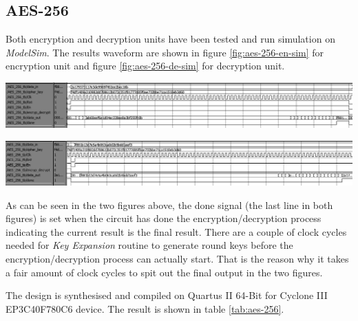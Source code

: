 \documentclass[a4paper, 10pt]{article}
\newenvironment{Figure}
    {\par\medskip\noindent\minipage{\linewidth}}
    {\endminipage\par\medskip}
\begin{document}
\begin{multicols}{2}
        \subsection{AES-256}

	Both encryption and decryption units have been tested and run simulation on \textit{ModelSim}. The results waveform are shown in figure \ref{fig:aes-256-en-sim} for encryption unit and figure \ref{fig:aes-256-de-sim} for decryption unit.

	\begin{Figure}
                \centering
                \includegraphics[width=\linewidth]{aes-256-encryption-waveform-edited.png}
                \label{fig:aes-256-en-sim}
            \end{Figure}

	\begin{Figure}
                \centering
                \includegraphics[width=\linewidth]{aes-256-decryption-waveform-edited.png}
                \label{fig:aes-256-de-sim}
            \end{Figure}

	As can be seen in the two figures above, the done signal (the last line in both figures) is set when the circuit has done the encryption/decryption process indicating the current result is the final result. There are a couple of clock cycles needed for \textit{Key Expansion} routine to generate round keys before the encryption/decryption process can actually start. That is the reason why it takes a fair amount of clock cycles to spit out the final output in the two figures.

	The design is synthesised and compiled on Quartus II 64-Bit for Cyclone III EP3C40F780C6 device. The result is shown in table \ref{tab:aes-256}.


\end{multicols}
\end{document}
